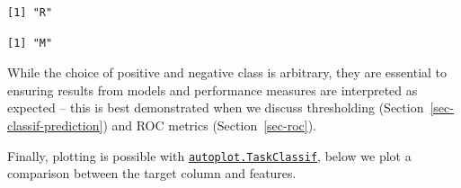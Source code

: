 \begin{verbatim}
[1] "R"
\end{verbatim}

\begin{Shaded}
\begin{Highlighting}[]
\SpecialCharTok{$}\OtherTok{=} 
\SpecialCharTok{$}
\end{Highlighting}
\end{Shaded}

\begin{verbatim}
[1] "M"
\end{verbatim}

While the choice of positive and negative class is arbitrary, they are
essential to ensuring results from models and performance measures are
interpreted as expected -- this is best demonstrated when we discuss
thresholding (Section~\ref{sec-classif-prediction}) and ROC metrics
(Section~\ref{sec-roc}).

Finally, plotting is possible with
\href{https://mlr3viz.mlr-org.com/reference/autoplot.TaskClassif.html}{\texttt{autoplot.TaskClassif}},
below we plot a comparison between the target column and features.

\begin{Shaded}
\begin{Highlighting}[]
\NormalTok{(}\NormalTok{(}\NormalTok{), } \NormalTok{) }\SpecialCharTok{+}
  \NormalTok{(} \NormalTok{(} \SpecialCharTok{{-}}\NormalTok{, } \NormalTok{))}
\end{Highlighting}
\end{Shaded}

